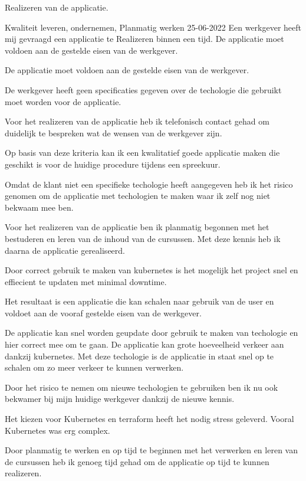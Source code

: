 {%
	\bewijs
	{%
		Realizeren van de applicatie.
	}
	{%
		\starr
		{%
			Kwaliteit leveren,
			ondernemen,
			Planmatig werken
		}
		{%
			25-06-2022
		}
		{%
			Een werkgever heeft mij gevraagd een applicatie te Realizeren binnen een tijd.
			De applicatie moet voldoen aan de gestelde eisen van de werkgever.
		}
		{%
			De applicatie moet voldoen aan de gestelde eisen van de werkgever.

			De werkgever heeft geen specificaties gegeven over de techologie die gebruikt moet worden voor de applicatie.

		}
		{%
			Voor het realizeren van de applicatie heb ik telefonisch contact gehad om duidelijk te bespreken wat de wensen van de werkgever zijn.

			Op basis van deze kriteria kan ik een kwalitatief goede applicatie maken die geschikt is voor de huidige procedure tijdens een spreekuur.

			Omdat de klant niet een specifieke techologie heeft aangegeven heb ik het risico genomen om de applicatie met techologien te maken waar ik zelf nog niet bekwaam mee ben.

			Voor het realizeren van de applicatie ben ik planmatig begonnen met het bestuderen en leren van de inhoud van de cursussen.
			Met deze kennis heb ik daarna de applicatie gerealiseerd.

			Door correct gebruik te maken van kubernetes is het mogelijk het project snel en effiecient te updaten met minimal downtime.

		}
		{%
			Het resultaat is een applicatie die kan schalen naar gebruik van de user en voldoet aan de vooraf gestelde eisen van de werkgever.

			De applicatie kan snel worden geupdate door gebruik te maken van techologie en hier correct mee om te gaan.
			De applicatie kan grote hoeveelheid verkeer aan dankzij kubernetes.
			Met deze techologie is de applicatie in staat snel op te schalen om zo meer verkeer te kunnen verwerken.

			Door het risico te nemen om nieuwe techologien te gebruiken ben ik nu ook bekwamer bij mijn huidige werkgever dankzij de nieuwe kennis.
		}
		{%

			Het kiezen voor Kubernetes en terraform heeft het nodig stress geleverd.
			Vooral Kubernetes was erg complex.

			Door planmatig te werken en op tijd te beginnen met het verwerken en leren van de cursussen heb ik genoeg tijd gehad om de applicatie op tijd te kunnen realizeren.

}}}

